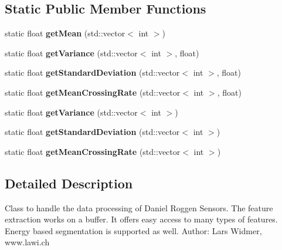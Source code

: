 \subsection*{Static Public Member Functions}
\begin{DoxyCompactItemize}
\item 
\hypertarget{classRoggenFeatureExtraction_af6f8cbf32efb908dd861cf5a7764e9ea}{
static float {\bfseries getMean} (std::vector$<$ int $>$)}
\label{classRoggenFeatureExtraction_af6f8cbf32efb908dd861cf5a7764e9ea}

\item 
\hypertarget{classRoggenFeatureExtraction_a9347d95b9f3f3d0e009ffabe0ee7114c}{
static float {\bfseries getVariance} (std::vector$<$ int $>$, float)}
\label{classRoggenFeatureExtraction_a9347d95b9f3f3d0e009ffabe0ee7114c}

\item 
\hypertarget{classRoggenFeatureExtraction_ae7db354175105343c9a946ea7e900f70}{
static float {\bfseries getStandardDeviation} (std::vector$<$ int $>$, float)}
\label{classRoggenFeatureExtraction_ae7db354175105343c9a946ea7e900f70}

\item 
\hypertarget{classRoggenFeatureExtraction_a38e1d4c6cdbc230c56ba179377f078fb}{
static float {\bfseries getMeanCrossingRate} (std::vector$<$ int $>$, float)}
\label{classRoggenFeatureExtraction_a38e1d4c6cdbc230c56ba179377f078fb}

\item 
\hypertarget{classRoggenFeatureExtraction_a441c2caa6abcd71e374cfb24f0d98d84}{
static float {\bfseries getVariance} (std::vector$<$ int $>$)}
\label{classRoggenFeatureExtraction_a441c2caa6abcd71e374cfb24f0d98d84}

\item 
\hypertarget{classRoggenFeatureExtraction_a37742fd6fed50ca561495958a55b51b1}{
static float {\bfseries getStandardDeviation} (std::vector$<$ int $>$)}
\label{classRoggenFeatureExtraction_a37742fd6fed50ca561495958a55b51b1}

\item 
\hypertarget{classRoggenFeatureExtraction_ac00e199124f96b72d07ead22a05a25d4}{
static float {\bfseries getMeanCrossingRate} (std::vector$<$ int $>$)}
\label{classRoggenFeatureExtraction_ac00e199124f96b72d07ead22a05a25d4}

\end{DoxyCompactItemize}


\subsection{Detailed Description}
Class to handle the data processing of Daniel Roggen Sensors. The feature extraction works on a buffer. It offers easy access to many types of features. Energy based segmentation is supported as well. Author: Lars Widmer, www.lawi.ch 

